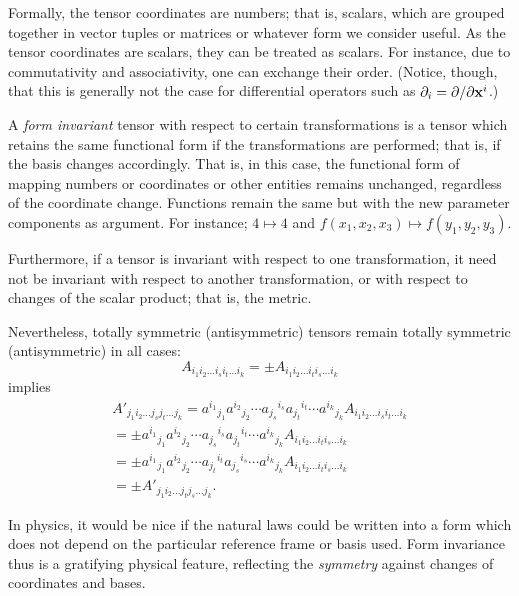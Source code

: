 Formally, the tensor coordinates are numbers; that is, scalars,
which are grouped together in vector tuples or matrices or whatever form we consider useful.
As the tensor coordinates are scalars, they can be treated as scalars.
For instance, due to commutativity and associativity, one can exchange
their order. (Notice, though, that this is generally not the case for
differential operators such as $\partial_i=\partial / \partial {\bf x}^i$.)

A {\em form invariant} tensor with respect to  certain transformations
is a tensor which retains
the same functional form if the transformations are performed; that is,
if the basis changes accordingly.
That is, in this case,
the functional form of mapping numbers or coordinates or other entities remains unchanged, regardless of the coordinate change.
Functions remain the same but with the new parameter components as
argument. For instance; $4\mapsto 4$ and $f(x_1,x_2,x_3)\mapsto
f( y_1, y_2, y_3)$.

Furthermore, if a tensor is invariant with respect to one transformation, it need not
be invariant with respect to another transformation, or with respect to
changes of the scalar product; that is, the metric.

Nevertheless, totally symmetric (antisymmetric) tensors remain totally
symmetric (antisymmetric) in all cases:
\begin{equation}
A_{i_1i_2 \ldots i_si_t\ldots i_k}
=
\pm A_{i_1i_2 \ldots i_ti_s\ldots i_k}
\end{equation}
implies
\begin{equation}
\begin{split}
A'_{j_1i_2 \ldots j_s j_t\ldots j_k}
=
{a^{i_1}}_{j_1}{a^{i_2}}_{j_2}
\cdots
{a_{j_s}}^{i_s}{a_{j_t}}^{i_t}
\cdots
{a^{i_k}}_{j_k} A_{i_1 i_2\ldots i_s i_t\ldots  i_k}
 \\
=
\pm {a^{i_1}}_{j_1}{a^{i_2}}_{j_2}\cdots
{a_{j_s}}^{i_s}{a_{j_t}}^{i_t}\cdots
{a^{i_k}}_{j_k} A_{i_1 i_2\ldots i_t i_s\ldots  i_k}
  \\
=
\pm {a^{i_1}}_{j_1}{a^{i_2}}_{j_2}
\cdots
{a_{j_t}}^{i_t}{a_{j_s}}^{i_s}
\cdots
{a^{i_k}}_{j_k} A_{i_1 i_2\ldots i_t i_s\ldots  i_k}
  \\
=
\pm A'_{j_1i_2 \ldots j_t j_s\ldots j_k}    .
\end{split}
\end{equation}


In physics, it would be nice if the natural laws could be written into a
form which does not depend on the particular reference frame or  basis
used.
Form invariance thus is a gratifying physical feature, reflecting the
{\em symmetry} against changes of coordinates and bases.

